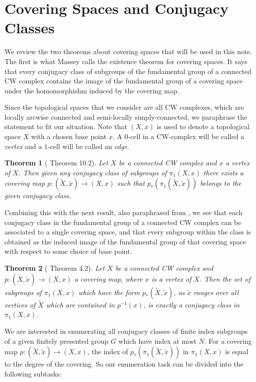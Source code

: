\documentclass[12pt]{article}
\begin{document}
\section{Covering Spaces and Conjugacy Classes}

We review the two theorems about covering spaces that will be used in this note.
The first is what Massey calls the existence theorem for covering spaces.  It
says that every conjugacy class of subgroups of the fundamental group of a
connected CW complex contains the image of the fundamental group of a
covering space under the homomorphishm induced by the covering map.

Since the topological spaces that we consider are all CW complexes, which are
locally arcwise connected and semi-locally simply-connected, we paraphrase the
statement to fit our situation.  Note that $(X,x)$ is used to denote a
topological space $X$ with a chosen base point $x$.  A $0$-cell in a CW-complex
will be called a {\it vertex} and a $1$-cell will be called an {\it edge}.

\newtheorem*{thm}{Theorem}
\begin{thm}[\cite{Massey} Theorem 10.2]
  Let $X$ be a connected CW complex and $x$ a vertex of $X$.  Then given any
  conjugacy class of subgroups of $\pi_1(X, x)$ there exists a covering map
  $p:(\tilde X, \tilde x) \to (X, x)$ such that $p_*(\pi_1(\tilde X, \tilde x))$
  belongs to the given conjugacy class.
\end{thm}

Combining this with the next result, also paraphrased from \cite{Massey}, we see that
each conjugacy class in the fundamental group of a connected CW complex can be
associated to a single covering space, and that every subgroup within the class
is obtained as the induced image of the fundamental group of that covering space
with respect to some choice of base point.

\begin{thm}[\cite{Massey} Theorem 4.2]
  Let $X$ be a connected CW complex and $p:(\tilde X, \tilde x )\to(X, x)$ a
  covering map, where $x$ is a vertex of $X$. Then the set of subgroups of
  $\pi_1(X, x)$ which have the form $p_*(\tilde X, \tilde x)$, as $\tilde x$
  ranges over all vertices of $\tilde X$ which are contained in $p^{-1}(x)$, is
  exactly a conjugacy class in $\pi_1(X, x)$.
  \end{thm}

  We are interested in enumerating all conjugacy classes of finite index subgroups
  of a given finitely presented group $G$ which have index at most $N$.  For a covering map
  $p:(\tilde X, \tilde x)\to (X, x)$, the index of $p_*(\pi_1(\tilde X, \tilde x))$
  in $\pi_1(X, x)$ is equal to the degree of the covering.  So our enumeration
  task can be divided into the following subtasks:
\end{document}
